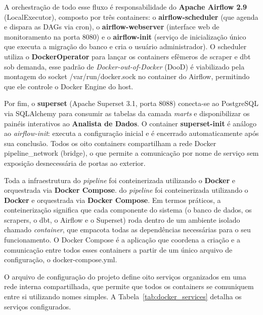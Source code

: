 A orchestração de todo esse fluxo é responsabilidade do \textbf{Apache Airflow 2.9} (LocalExecutor), composto por três containers: o \textbf{airflow-scheduler} (que agenda e dispara as DAGs via cron), o \textbf{airflow-webserver} (interface web de monitoramento na porta 8080) e o \textbf{airflow-init} (serviço de inicialização único que executa a migração do banco e cria o usuário administrador). O scheduler utiliza o \textbf{DockerOperator} para lançar os containers efêmeros de scraper e dbt sob demanda, esse padrão de \textit{Docker-out-of-Docker} (DooD) é viabilizado pela montagem do socket /var/run/docker.sock no container do Airflow, permitindo que ele controle o Docker Engine do host.

Por fim, o \textbf{superset} (Apache Superset 3.1, porta 8088) conecta-se ao PostgreSQL via SQLAlchemy para consumir as tabelas da camada \textit{marts} e disponibilizar os painéis interativos ao \textbf{Analista de Dados}. O container \textbf{superset-init} é análogo ao \textit{airflow-init}: executa a configuração inicial e é encerrado automaticamente após sua conclusão. Todos os oito containers compartilham a rede Docker pipeline\_network (bridge), o que permite a comunicação por nome de serviço sem exposição desnecessária de portas ao exterior.

Toda a infraestrutura do \textit{pipeline} foi conteinerizada utilizando o \textbf{Docker} e
orquestrada via \textbf{Docker Compose}. do \textit{pipeline} foi conteinerizada utilizando o \textbf{Docker} e
orquestrada via \textbf{Docker Compose}. Em termos práticos, a conteinerização significa que
cada componente do sistema (o banco de dados, os scrapers, o dbt, o Airflow e o Superset) roda dentro de um ambiente isolado chamado \textit{container}, que empacota todas as
dependências necessárias para o seu funcionamento. O Docker Compose é a aplicação que
coordena a criação e a comunicação entre todos esses containers a partir de um único arquivo
de configuração, o docker-compose.yml.

O arquivo de configuração do projeto define oito serviços organizados em uma rede interna
compartilhada, que permite que todos os containers se comuniquem entre si utilizando nomes
simples. A Tabela~\ref{tab:docker_services} detalha os serviços configurados.

